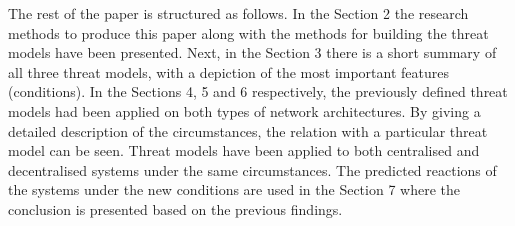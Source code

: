 The rest of the paper is structured as follows.
In the Section 2 the research methods to produce this paper along with the methods for building the threat models have been presented.
Next, in the Section 3 there is a short summary of all three threat models, with a depiction of the most important features (conditions).
In the Sections 4, 5 and 6 respectively, the previously defined threat models had been applied on both types of network architectures.
By giving a detailed description of the circumstances, the relation with a particular threat model can be seen.
Threat models have been applied to both centralised and decentralised systems under the same circumstances.
The predicted reactions of the systems under the new conditions are used in the Section 7 where the conclusion is presented based on the previous findings.
